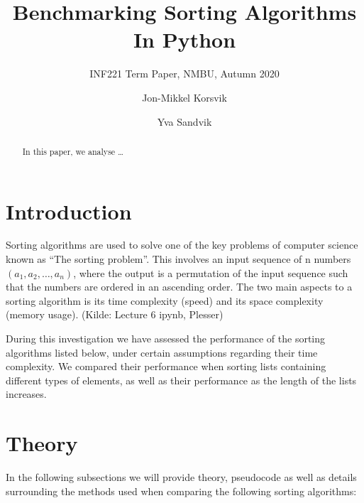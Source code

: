 \documentclass[sigconf, nonacm, natbib, screen, balance=False]{acmart}
\begin{document}
\title{Benchmarking Sorting Algorithms In Python}
\subtitle{INF221 Term Paper, NMBU, Autumn 2020}

\author{Jon-Mikkel Korsvik}
\affiliation{}  %

\author{Yva Sandvik}

\begin{abstract}
  In this paper, we analyse \dots 
\end{abstract}


\maketitle

\section{Introduction}\label{sec:intro}

Sorting algorithms are used to solve one of the key problems of computer science known as “The sorting problem”. This involves an input sequence of n numbers $(a_1, a_2, … , a_n)$, where the output is a permutation of the input sequence such that the numbers are ordered in an ascending order. The two main aspects to a sorting algorithm is its time complexity (speed) and its space complexity (memory usage). (Kilde: Lecture 6 ipynb, Plesser)

During this investigation we have assessed the performance of the sorting algorithms listed below, under certain assumptions regarding their time complexity. We compared their performance when sorting lists containing different types of elements, as well as their performance as the length of the lists increases. 

\section{Theory}\label{sec:theory}

In the following subsections we will provide theory, pseudocode as well as details surrounding the methods used when comparing the following sorting algorithms: 
\end{document}
